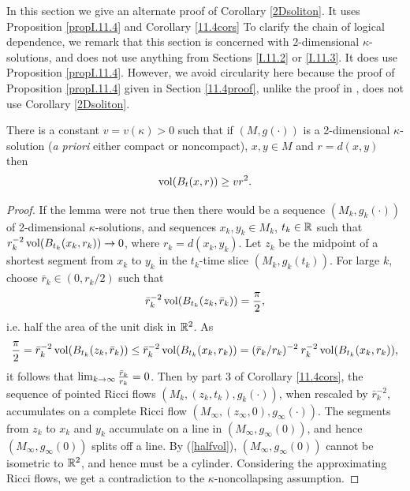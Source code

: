 In this section we give an alternate proof of Corollary \ref{2Dsoliton}.
It uses Proposition \ref{propI.11.4} and Corollary \ref{11.4cors}
To clarify the chain of logical dependence, we remark that
this section is concerned with $2$-dimensional $\kappa$-solutions,
and does not use anything from Sections \ref{I.11.2} or \ref{I.11.3}.   It does use
Proposition \ref{propI.11.4}.  However, we avoid circularity here because the proof
of Proposition \ref{propI.11.4} given in Section \ref{11.4proof}, unlike the
proof in \cite{Perelman}, does not use Corollary \ref{2Dsoliton}.
\begin{lemma}
  \label{lem:kl-alternate-proof-corollary-2dsoliton-using-proposition-propi-11-4-corolla-existence-kappa-solutions}

\label{2dvol}
There is a constant $v=v(\kappa)>0$ such that if
$(M,g(\cdot))$ is a 2-dimensional $\kappa$-solution
({\it a priori} either compact or noncompact), $x,y\in M$ and
$r = d(x,y)$ then
\begin{equation}
\label{volnotsmall}
\operatorname{vol}(B_t(x,r))\geq vr^2.
\end{equation}
\end{lemma}
\begin{proof}
If the lemma were not true then there would be a sequence $(M_k,g_k(\cdot))$
of 2-dimensional $\kappa$-solutions, and sequences $x_k,y_k\in M_k$, $t_k\in{\mathbb R}$
such that $r_k^{-2}\operatorname{vol}(B_{t_k}(x_k,r_k))\rightarrow 0$, where
$r_k = d(x_k,y_k)$.  Let $z_k$ be the midpoint of a shortest segment
from $x_k$ to $y_k$ in the $t_k$-time slice $(M_k,g_k(t_k))$. For large $k$,
choose
$\bar r_k \in (0, r_k/2)$ such that
\begin{equation}
\label{halfvol}
\bar r_k^{-2}\operatorname{vol}(B_{t_k}(z_k,\bar r_k))=\frac{\pi}{2},
\end{equation}
 i.e.
half the area of the  unit disk in ${\mathbb R}^2$.
As
\begin{equation}
\frac{\pi}{2} = \bar r_k^{-2}\operatorname{vol}(B_{t_k}(z_k,\bar r_k)) \le
\bar r_k^{-2}\operatorname{vol}(B_{t_k}(x_k, r_k)) =
(\bar r_k / r_k)^{-2} \:  r_k^{-2} \operatorname{vol}(B_{t_k}(x_k, r_k)),
\end{equation}
it follows that
$\lim_{k\rightarrow\infty}\frac{\bar r_k}{ r_k}=0$.
Then by part 3 of Corollary \ref{11.4cors},
the sequence of pointed Ricci flows $(M_k,(z_k,t_k),g_k(\cdot))$,
when rescaled by $\bar r_k^{-2}$, accumulates on a complete Ricci flow
$(M_\infty,(z_\infty,0),g_\infty(\cdot))$.  The segments from $z_k$
to $x_k$ and $y_k$ accumulate on a line in $(M_\infty,g_\infty(0))$,
and hence $(M_\infty,g_\infty(0))$ splits off a line.  By (\ref{halfvol}),
$(M_\infty,g_\infty(0))$ cannot be isometric to ${\mathbb R}^2$, and hence
must be a cylinder.  Considering the approximating
Ricci flows, we get a contradiction to the $\kappa$-noncollapsing assumption.
\end{proof}
